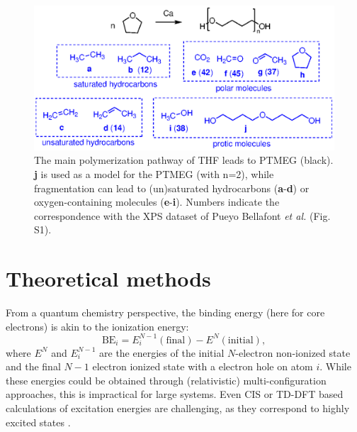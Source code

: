 \documentclass[%
aip,
amsmath,amssymb,
preprint,%
jcp,
showkeys,
]{revtex4-2}
\begin{document}
\begin{figure}[!h]
	\centering
	\includegraphics[width=\linewidth]{Figure1}
	\caption{The main polymerization pathway of THF leads to PTMEG (black). \textbf{j} is used as a model for the PTMEG (with n=2), while fragmentation can lead to (un)saturated hydrocarbons (\textbf{a}-\textbf{d}) or oxygen-containing molecules (\textbf{e}-\textbf{i}). Numbers indicate the correspondence with the XPS dataset of Pueyo Bellafont \emph{et al.}\cite{pueyobellafontPerformanceTPSSFunctional2016} (Fig. S1).}
	\label{fig:THFdegradation}
\end{figure}

\section{Theoretical methods}\label{sec:theo}

From a quantum chemistry perspective, the binding energy (here for core electrons) is akin to the ionization energy:
\begin{equation}
	\text{BE}_i = E^{N-1}_i(\text{final}) - E^{N}(\text{initial}), \label{eq:dscf}
\end{equation}
where $E^{N}$ and $E^{N-1}_i$ are the energies of the initial $N$-electron non-ionized state and the final $N-1$ electron ionized state with a electron hole on atom $i$. While these energies could be obtained through (relativistic) multi-configuration approaches, this is impractical for large systems. Even CIS or TD-DFT based calculations of excitation energies are challenging, as they correspond to highly excited states \cite{vinesPredictionCoreLevel2018}.
\end{document}
